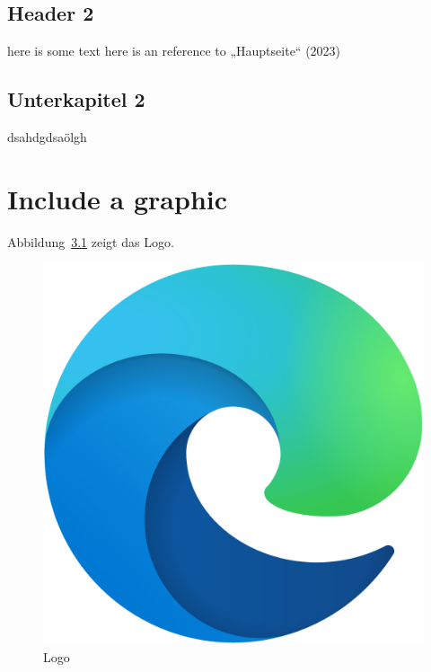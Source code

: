\documentclass[
  11pt,
]{scrbook}
\begin{document}
\newpage{}

\hypertarget{header-2}{%
\section{Header 2}\label{header-2}}

here is some text here is an reference to {„Hauptseite``} (2023)

\newpage{}

\hypertarget{unterkapitel-2}{%
\section{Unterkapitel 2}\label{unterkapitel-2}}

dsahdgdsaölgh

\hypertarget{include-a-graphic}{%
\chapter{Include a graphic}\label{include-a-graphic}}

Abbildung~\ref{fig-LOGO} zeigt das Logo.

\begin{figure}

{\centering \includegraphics{logo.png}

}

\caption{\label{fig-LOGO}Logo}

\end{figure}
\end{document}
